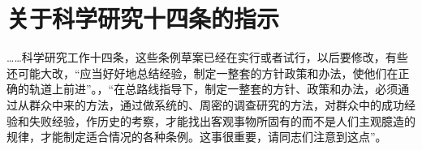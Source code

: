\section[关于科学研究十四条的指示（一九六二年一月）]{关于科学研究十四条的指示}


……科学研究工作十四条，这些条例草案已经在实行或者试行，以后要修改，有些还可能大改，“应当好好地总结经验，制定一整套的方针政策和办法，使他们在正确的轨道上前进”。，“在总路线指导下，制定一整套的方针、政策和办法，必须通过从群众中来的方法，通过做系统的、周密的调查研究的方法，对群众中的成功经验和失败经验，作历史的考察，才能找出客观事物所固有的而不是人们主观臆造的规律，才能制定适合情况的各种条例。这事很重要，请同志们注意到这点”。


